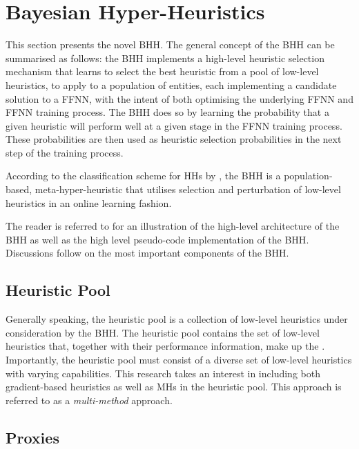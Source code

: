 \section{Bayesian Hyper-Heuristics}
\label{sec:bhh}

This section presents the novel \acs{BHH}. The general concept of the \acs{BHH} can be summarised as follows: the \acs{BHH} implements a high-level heuristic selection mechanism that learns to select the best heuristic from a pool of low-level heuristics, to apply to a population of entities, each implementing a candidate solution to a \acs{FFNN}, with the intent of both optimising the underlying \acs{FFNN} and \acs{FFNN} training process. The \acs{BHH} does so by learning the probability that a given heuristic will perform well at a given stage in the \acs{FFNN} training process. These probabilities are then used as heuristic selection probabilities in the next step of the training process.

According to the classification scheme for \acp{HH} by \citeauthor{ref:burke:2010} \cite{ref:burke:2010}, the \acs{BHH} is a population-based, meta-hyper-heuristic that utilises selection and perturbation of low-level heuristics in an online learning fashion.

The reader is referred to \cite{ref:schreuder:2022} for an illustration of the high-level architecture of the \acs{BHH} as well as the high level pseudo-code implementation of the \acs{BHH}. Discussions follow on the most important components of the \acs{BHH}.

\subsection{Heuristic Pool}\label{sec:bhh:heuristic_pool}

Generally speaking, the heuristic pool is a collection of low-level heuristics under consideration by the \acs{BHH}. The heuristic pool contains the set of low-level heuristics that, together with their performance information, make up the . Importantly, the heuristic pool must consist of a diverse set of low-level heuristics with varying capabilities. This research takes an interest in including both gradient-based heuristics as well as \acp{MH} in the heuristic pool. This approach is referred to as a \textit{multi-method} approach.

\subsection{Proxies}\label{sec:bhh:heuristic:proxies}

